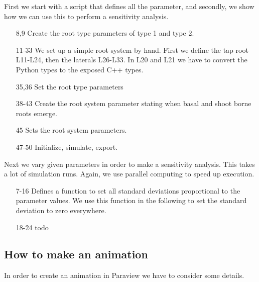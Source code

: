 \documentclass[a4paper]{article}
\begin{document}
First we start with a script that defines all the parameter, and secondly, we show how we can use this to perform a sensitivity analysis.



\begin{itemize}

\item[8,9] Create the root type parameters of type 1 and type 2.
\item[11-33] We set up a simple root system by hand. First we define the tap root L11-L24, then the laterals L26-L33. In L20 and L21 we have to convert the Python types to the exposed C++ types.
\item[35,36] Set the root type parameters

\item[38-43] Create the root system parameter stating when basal and shoot borne roots emerge.

\item[45] Sets the root system parameters.

\item[47-50] Initialize, simulate, export. 

\end{itemize}

Next we vary given parameters in order to make a sensitivity analysis. This takes a lot of simulation runs. Again, we use parallel computing to speed up execution.



\begin{itemize}

\item[7-16] Defines a function to set all standard deviations proportional to the parameter values. We use this function in the following to set the standard deviation to zero everywhere. 

\item[18-24] todo

\end{itemize}



\subsection{How to make an animation}

In order to create an animation in Paraview we have to consider some details. 
\end{document}
